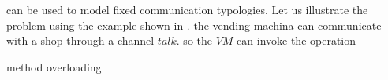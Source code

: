 \oz{} can be used to model fixed communication typologies.
Let us illustrate the problem using the example shown in . the vending machina can communicate with a shop through a channel $talk$. so the $VM$ can invoke the operation 


method overloading


